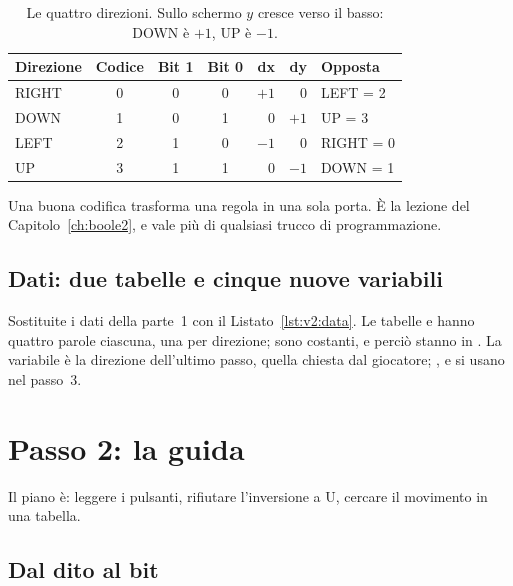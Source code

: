\begin{table}[htb]
\centering\small
\caption{Le quattro direzioni. Sullo schermo $y$ cresce verso il basso: DOWN è
$+1$, UP è $-1$.}\label{tab:v2:dirs}
\begin{tabular}{@{}lcccrrl@{}}
\toprule
\textbf{Direzione} & \textbf{Codice} & \textbf{Bit 1} & \textbf{Bit 0} & \textbf{dx} & \textbf{dy} & \textbf{Opposta}\\
\midrule
RIGHT & 0 & 0 & 0 & $+1$ & 0 & LEFT = 2\\
DOWN & 1 & 0 & 1 & 0 & $+1$ & UP = 3\\
LEFT & 2 & 1 & 0 & $-1$ & 0 & RIGHT = 0\\
UP & 3 & 1 & 1 & 0 & $-1$ & DOWN = 1\\
\bottomrule
\end{tabular}
\end{table}

\begin{prgconcept}
Una buona codifica trasforma una regola in una sola porta. È la lezione del
Capitolo~\ref{ch:boole2}, e vale più di qualsiasi trucco di programmazione.
\end{prgconcept}

\subsection{Dati: due tabelle e cinque nuove variabili}

Sostituite i dati della parte~1 con il Listato~\ref{lst:v2:data}. Le tabelle
 e  hanno quattro parole ciascuna, una per direzione; sono
costanti, e perciò stanno in . La variabile  è la
direzione dell'ultimo passo,  quella chiesta dal giocatore;
,  e  si usano nel passo~3.


\section{Passo 2: la guida}

Il piano è: leggere i pulsanti, rifiutare l'inversione a U, cercare il
movimento in una tabella.

\subsection{Dal dito al bit}

